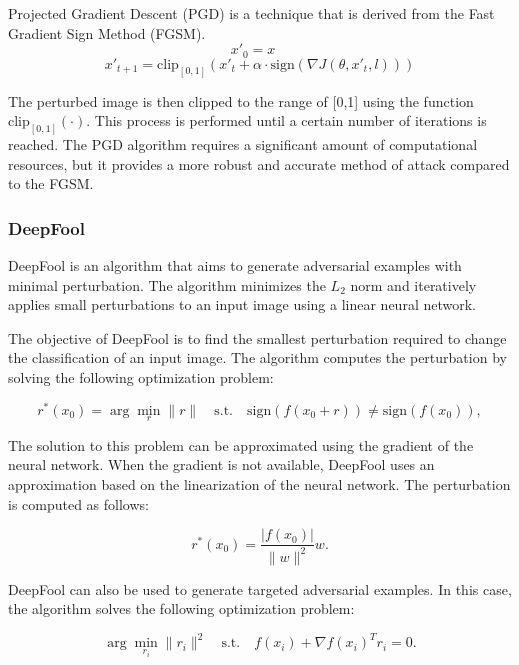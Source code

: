 \documentclass[10pt, conference, a4paper, final]{IEEEtran}
\begin{document}
Projected Gradient Descent (PGD) is a technique that is derived from the Fast Gradient Sign Method (FGSM).
\begin{equation}
    x'_0 = x \quad 
    \end{equation}
    \begin{equation}
    x'_{t+1} = \text{clip}_{[0,1]} \left( x'_t + \alpha \cdot \text{sign}(\nabla J(\theta, x'_t, l)) \right)
    \end{equation}

The perturbed image is then clipped to the range of [0,1] using the function \(\text{clip}_{[0,1]}(\cdot)\). This process is performed until a certain number of iterations is reached. The PGD algorithm requires a significant amount of computational resources, but it provides a more robust and accurate method of attack compared to the FGSM.


\subsubsection{DeepFool}

DeepFool \cite {Moosavi} is an algorithm that aims to generate adversarial examples with minimal perturbation. The algorithm minimizes the \(L_2\) norm and iteratively applies small perturbations to an input image using a linear neural network. 

The objective of DeepFool is to find the smallest perturbation required to change the classification of an input image. The algorithm computes the perturbation by solving the following optimization problem:

\begin{equation}
r^*(x_0) = \arg\min_r \|r\| \quad \text{s.t.} \quad \text{sign}(f(x_0 + r)) \neq \text{sign}(f(x_0)),
\end{equation}

The solution to this problem can be approximated using the gradient of the neural network. When the gradient is not available, DeepFool uses an approximation based on the linearization of the neural network. The perturbation is computed as follows:

\begin{equation}
r^*(x_0) = \frac{|f(x_0)|}{\|w\|^2} w.
\end{equation}

DeepFool can also be used to generate targeted adversarial examples. In this case, the algorithm solves the following optimization problem:

\begin{equation}
\arg\min_{r_i} \|r_i\|^2 \quad \text{s.t.} \quad f(x_i) + \nabla f(x_i)^T r_i = 0.
\end{equation}
\end{document}
